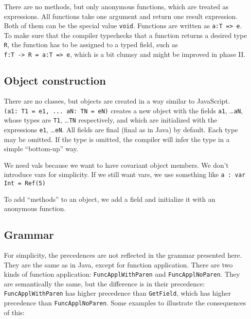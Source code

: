 \documentclass[12pt, draft]{article}
\begin{document}
There are no methods, but only anonymous functions, which are treated as expressions. All functions take one argument and return one result expression. Both of them can be the special value \texttt{void}. Functions are written as \texttt{a:}\texttt{T => e}. To make sure that the compiler typechecks that a function returns a desired type \texttt{R}, the function has to be assigned to a typed field, such as \\ 
\texttt{f:}\texttt{T -> R = a:}\texttt{T => e}, which is a bit clumsy and might be improved in phase II.

\subsection{Object construction}

There are no classes, but objects are created in a way similar to JavaScript. \\
\texttt{(a1: T1 = e1, ... aN: TN = eN)} creates a new object with the fields \texttt{a1}, \dots \texttt{aN}, whose types are \texttt{T1}, \dots \texttt{TN} respectively, and which are initialized with the expressions \texttt{e1}, \dots \texttt{eN}. All fields are final (final as in Java) by default. Each type may be omitted. If the type is omitted, the compiler will infer the type in a simple ``bottom-up'' way.

We need vals because we want to have covariant object members. We don't introduce vars for simplicity. If we still want vars, we use something like \texttt{a : var Int = Ref(5)}

To add ``methods'' to an object, we add a field and initialize it with an anonymous function.

\subsection{Grammar}

For simplicity, the precedences are not reflected in the grammar presented here. They are the same as in Java, except for function application. There are two kinds of function application: \texttt{FuncApplWithParen} and \texttt{FuncApplNoParen}. They are semantically the same, but the difference is in their precedence: \texttt{FuncApplWithParen} has higher precedence than \texttt{GetField}, which has higher precedence than \texttt{FuncApplNoParen}. Some examples to illustrate the consequences of this:

\hspace{0.4cm}
\end{document}
